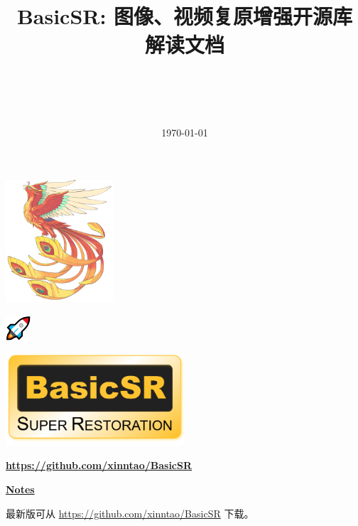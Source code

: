 \documentclass[a4paper, 12pt, oneside]{memoir}
\title{
	\vspace{4cm}
	\normalfont \normalsize
	\horrule{0.5pt} \\[0.4cm]
	\huge \begin{CJK}{UTF8}{gbsn} BasicSR: 图像、视频复原增强开源库
		\\ 解读文档\end{CJK}
	\horrule{2pt} \\[0.5cm]
}
\date{\normalsize\today}
\begin{document}
	\maketitle
	\thispagestyle{empty}

	\vspace{-14.5cm}
	\begin{adjustwidth}{0.5cm}{}
		\hspace{5.5cm}
		\includegraphics[width=0.3\textwidth]{figures/xpixel-logo.jpg}
	\end{adjustwidth}
	\vspace{1.2cm}
	\begin{adjustwidth}{0.5cm}{}
		\includegraphics[width=0.07\textwidth]{figures/rocket_logo.png}
	\end{adjustwidth}
	\vspace{5cm}

	\begin{center}
		\includegraphics[width=0.5\textwidth]{figures/basicsr_logo.png}
	\end{center}
	\begin{center}
		\underline{\textbf{\url{https://github.com/xinntao/BasicSR}}}
	\end{center}

	\vspace{2.2cm}
	\begin{center}
		\textcolor{ChadBlue}{\underline{\textbf{Notes}}}
	\end{center}
	\vspace{0.5cm}
	\begin{CJK}{UTF8}{gbsn}

		最新版可从 \url{https://github.com/xinntao/BasicSR} 下载。
	\end{CJK}
\end{document}
